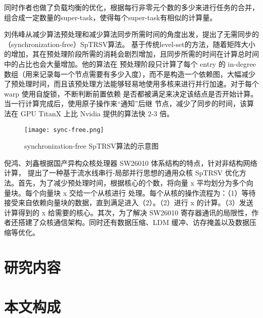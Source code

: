 同时作者也做了负载均衡的优化，根据每行非零元个数的多少来进行任务的合并，组合成一定数量的super-task，使得每个super-task有相似的计算量。

刘伟峰\cite{liuSyncFree2016,liuFastSynchronizationfreeAlgorithms2017}从减少算法预处理和减少算法同步所需时间的角度出发，提出了无需同步的（synchronization-free）SpTRSV算法。 基于传统level-set的方法，随着矩阵大小的增加，其在预处理阶段所需的消耗会剧烈增加，且同步所需的时间在计算总时间中的占比也会大量增加。他的算法在 预处理阶段只计算了每个 entry 的 in-degree 数组（用来记录每一个节点需要有多少入度），而不是构造一个依赖图，大幅减少了预处理时间，而且该预处理方法能够轻易地使用多核来进行并行加速。对于每个 warp 使用自旋锁，不断判断前置依赖 是否都被满足来决定该结点是否开始计算。当一行计算完成后，使用原子操作来“通知”后继 节点，减少了同步的时间，该算法在 GPU TitanX 上比 Nvidia 提供的算法快 2-3 倍。

\begin{figure}[htbp]
    \centering
    \texttt{[image: sync-free.png]}
    \caption{synchronization-free SpTRSV算法的示意图}
    \label{sync-free}
\end{figure}

倪鸿、刘鑫\cite{nihong2019}根据国产异构众核处理器 SW26010 体系结构的特点，针对非结构网络计算， 提出了一种基于流水线串行-局部并行思想的通用众核 SpTRSV 优化方法。首先，为了减少预处理时间，根据核心的个数，将向量 x 平均划分为多个向量块。每个向量块 x 交给一个从核进行 处理。每个从核的操作流程为：（1）等待接受来自依赖向量块的数据，直到满足进入（2）。（2）进行 x 的计算。（3）发送计算得到的 x 给需要的核心。其次，为了解决 SW26010 寄存器通讯的局限性，作者还搭建了众核通信架构。同时还有数据压缩、LDM 缓冲、访存掩盖以及数据压缩等优化。

\section{研究内容}


\section{本文构成}


\endinput
